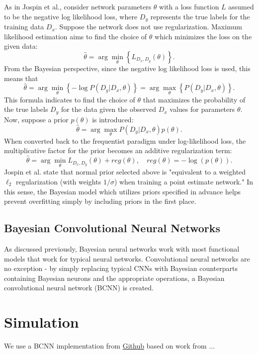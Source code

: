 \documentclass[12pt]{article}
\begin{document}
As in Jospin et al., consider network parameters $\theta$ with a loss function $L$ assumed to be the negative log likelihood loss, where $D_y$ represents the true labels for the training data $D_x$. Suppose the network does not use regularization. Maximum likelihood estimation aims to find the choice of $\theta$ which minimizes the loss on the given data:
$$
\hat{\theta} = \arg \min_{\theta} \left\{ L_{D_x, D_y} (\theta) \right\}.
$$
From the Bayesian perspective, since the negative log likelihood loss is used, this means that
$$
\hat{\theta} = \arg \min_{\theta} \left\{- \log P(D_y|D_x, \theta) \right\} = \arg \max_{\theta} \left\{ P(D_y|D_x, \theta) \right\}.
$$
This formula indicates to find the choice of $\theta$ that maximizes the probability of the true labels $D_y$ for the data given the observed $D_x$ values for parameters $\theta$. Now, suppose a prior $p(\theta)$ is introduced:
$$
\hat{\theta} = \arg \max_{\theta} P(D_y|D_x, \theta) p(\theta).
$$
When converted back to the frequentist paradigm under log-likelihood loss, the multiplicative factor for the prior becomes an additive regularization term:
$$
\hat{\theta} = \arg \min_{\theta} L_{D_x, D_y} (\theta) + reg(\theta), \quad reg(\theta) = -\log(p(\theta)).
$$
Jospin et al. state that normal prior selected above is "equivalent to a weighted $\ell_2$ regularization (with weights $1/\sigma$) when training a point estimate network." In this sense, the Bayesian model which utilizes priors specified in advance helps prevent overfitting simply by including priors in the first place. 

\subsection{Bayesian Convolutional Neural Networks}

As discussed previously, Bayesian neural networks work with most functional models that work for typical neural networks. Convolutional neural networks are no exception - by simply replacing typical CNNs with Bayesian counterparts containing Bayesian neurons and the appropriate operations, a Bayesian convolutional neural network (BCNN) is created. 

\section{Simulation}

We use a BCNN implementation from \href{https://github.com/kumar-shridhar/PyTorch-BayesianCNN}{Github} based on work from ... \cite{shridhar2019comprehensive} \cite{shridhar2018uncertainty}
\end{document}

